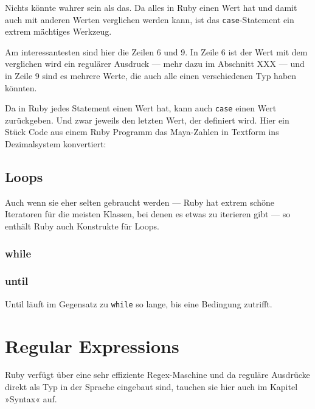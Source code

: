 \documentclass[a4book,11pt,twoside]{scrbook}
\begin{document}
Nichts könnte wahrer sein als das. Da alles in Ruby einen Wert hat und damit auch mit anderen Werten verglichen werden kann, ist das \texttt{case}-Statement ein extrem mächtiges Werkzeug.



Am interessantesten sind hier die Zeilen 6 und 9. In Zeile 6 ist der Wert mit dem verglichen wird ein regulärer Ausdruck — mehr dazu im Abschnitt XXX — und in Zeile 9 sind es mehrere Werte, die auch alle einen verschiedenen Typ haben könnten.


Da in Ruby jedes Statement einen Wert hat, kann auch \texttt{case} einen Wert zurückgeben. Und zwar jeweils den letzten Wert, der definiert wird. Hier ein Stück Code aus einem Ruby Programm das Maya-Zahlen in Textform ins Dezimalsystem konvertiert:





\subsection*{Loops} %
\label{sub:loops}
Auch wenn sie eher selten gebraucht werden — Ruby hat extrem schöne Iteratoren für die meisten Klassen, bei denen es etwas zu iterieren gibt — so enthält Ruby auch Konstrukte für Loops.

\subsubsection*{while} %
\label{ssub:while}


\subsubsection{until} %
\label{ssub:until}
Until läuft im Gegensatz zu \texttt{while} so lange, bis eine Bedingung zutrifft.





\section{Regular Expressions} %
\label{sec:regular_expressions}
Ruby verfügt über eine sehr effiziente Regex-Maschine und da reguläre Ausdrücke direkt als Typ in der Sprache eingebaut sind, tauchen sie hier auch im Kapitel »Syntax« auf.
\end{document}
